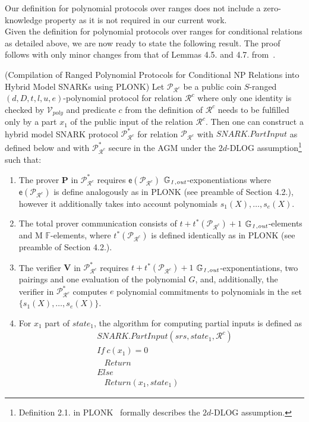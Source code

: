 \noindent Our definition for polynomial protocols over ranges does not include a zero-knowledge property as it is not required in our current work. \\

\noindent Given the definition for polynomial protocols over ranges for conditional relations as detailed above, we are now ready to state the following result.
The proof follows with only minor changes from that of Lemmas 4.5. and 4.7. from~\cite{plonk}. 

\begin{lemma}(Compilation of Ranged Polynomial Protocols for Conditional NP Relations into Hybrid Model SNARKs using PLONK) 
\label{le:compilation_step_1}
Let $\mathscr{P}_{\mathcal{R}^c}$ be a public coin $S$-ranged $(d, D, t, l, u, e)$-polynomial protocol for relation $\mathcal{R}^c$ where only 
one identity is checked by $\mathcal{V}_{poly}$ and predicate $c$ from the definition of ${\mathcal{R}^c}$ needs to be fulfilled only by a part $x_1$ 
of the public input of the relation ${\mathcal{R}^c}$. Then one can construct a hybrid model SNARK protocol $\mathscr{P}^*_{\mathcal{R}^c}$ for relation 
$\mathscr{P}_{\mathcal{R}^c}$ with $\mathit{SNARK.PartInput}$ as defined below 
and with $\mathscr{P}^*_{\mathcal{R}^c}$ secure in the AGM under the $2d$-DLOG 
assumption\footnote{Definition 2.1. in PLONK~\cite{plonk} formally describes the $2d$-DLOG assumption.} such that:
\begin{enumerate}
\item The prover $\mathbf{P}$ in $\mathscr{P}^*_{\mathcal{R}^c}$ requires $\mathsf{e}(\mathscr{P}_{\mathcal{R}^c})$ $\mathbb{G}_{\mathit{1,out}}$-exponentiations where 
$\mathsf{e}(\mathscr{P}_{\mathcal{R}^c})$ is define analogously as in PLONK (see preamble of Section 4.2.), however it additionally takes into account 
polynomials $s_1(X), \ldots, s_e(X)$. 
\item The total prover communication consists of $t + t^*(\mathscr{P}_{\mathcal{R}^c}) + 1$ $\mathbb{G}_{\mathit{1,out}}$-elements and M $\mathbb{F}$-elements, where 
$t^*(\mathscr{P}_{\mathcal{R}^c})$ is defined identically as in PLONK (see preamble of Section 4.2.).
\item The verifier $\mathbf{V}$ in $\mathscr{P}^*_{\mathcal{R}^c}$ requires $t + t^*(\mathscr{P}_{\mathcal{R}^c})+1$ $\mathbb{G}_{\mathit{1,out}}$-exponentiations, 
two pairings and one evaluation of the polynomial $G$, and, additionally, the verifier in $\mathscr{P}^*_{\mathcal{R}^c}$ computes $e$ 
polynomial commitments to polynomials in the set $\{s_1(X), \ldots, s_e(X)\}$. 
\item For $x_1$ part of  $\mathit{state_1}$, the algorithm for computing partial inputs is defined as 
\begin{align*}
&\mathit{SNARK.PartInput}(\mathit{srs}, \mathit{state_1}, \mathcal{R}^c) \\
&\mathit{If \ } c(x_1) = 0 \\
&\ \ \ \ \mathit{Return} \\
&\mathit{Else } \\
&\ \ \ \ \mathit{Return} (x_1, \mathit{state_1})
\end{align*}
\end{enumerate}
\end{lemma}